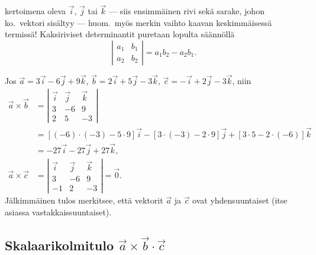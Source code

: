 kertoimena oleva $\vec i$, $\vec j$ tai $\vec k$ --- siis ensimmäinen rivi sekä sarake, 
johon ko.\ vektori sisältyy --- huom.\ myös merkin vaihto kaavan keskimmäisessä termissä!
Kaksiriviset determinantit puretaan lopulta säännöllä
\[
\left|\begin{array}{cc} 
a_1 & b_1 \\
a_2 & b_2
\end{array} \right| = a_1b_2 - a_2b_1.
\]
\begin{Exa} Jos $\vec a = 3\vec i -6\vec j + 9\vec k$, $\vec b = 2\vec i + 5\vec j - 3\vec k$, 
$\vec c = -\vec i + 2\vec j - 3\vec k$, niin
\begin{align*}
\vec a \times \vec b &= \left| \begin{array}{rrr} \vec i & \vec j & \vec k \\ 3 & -6 & 9 \\ 
                                                          2 & 5 & -3 \end{array} \right| \\
                     &= [(-6)\cdot(-3)-5\cdot 9]\vec i - [3\cdot(-3)-2\cdot 9]\vec j 
                                                       + [3\cdot 5 -2\cdot(-6)]\vec k \\
                     &= -27\vec i -27\vec j + 27\vec k, \\
\vec a \times \vec c &= \left|\begin{array}{rrr} \vec i & \vec j & \vec k \\ 3&-6&9 \\
                                                -1&2&-3 \end{array}\right| = \vec 0. 
\end{align*}
Jälkimmäinen tulos merkitsee, että vektorit $\vec a$ ja $\vec c$ ovat yhdensuuntaiset (itse 
asiassa vastakkaissuuntaiset). \loppu
\end{Exa}

\subsection*{Skalaarikolmitulo $\vec a\times\vec b\cdot\vec c$}

